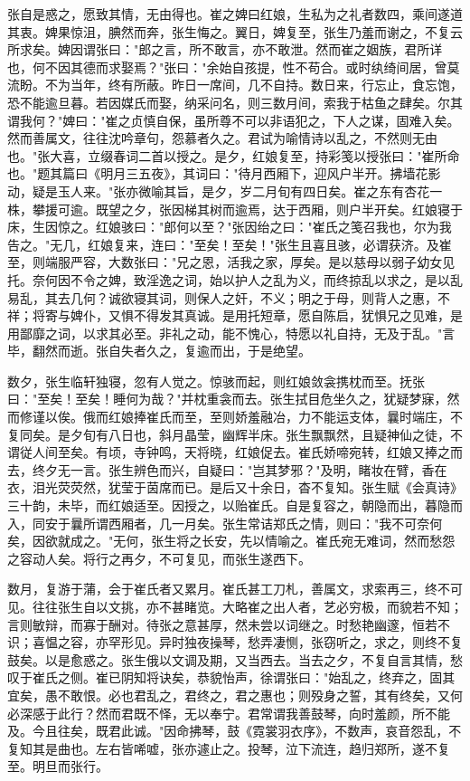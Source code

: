 \documentclass[UTF8,titlepage,oneside]{ctexbook}
\begin{document}
张自是惑之，愿致其情，无由得也。崔之婢曰红娘，生私为之礼者数四，乘间遂道其衷。婢果惊沮，腆然而奔，张生悔之。翼日，婢复至，张生乃羞而谢之，不复云所求矣。婢因谓张曰："郎之言，所不敢言，亦不敢泄。然而崔之姻族，君所详也，何不因其德而求娶焉？"张曰："余始自孩提，性不苟合。或时纨绮间居，曾莫流盼。不为当年，终有所蔽。昨日一席间，几不自持。数日来，行忘止，食忘饱，恐不能逾旦暮。若因媒氏而娶，纳采问名，则三数月间，索我于枯鱼之肆矣。尔其谓我何？"婢曰："崔之贞慎自保，虽所尊不可以非语犯之，下人之谋，固难入矣。然而善属文，往往沈吟章句，怨慕者久之。君试为喻情诗以乱之，不然则无由也。"张大喜，立缀春词二首以授之。是夕，红娘复至，持彩笺以授张曰："崔所命也。"题其篇曰《明月三五夜》，其词曰："待月西厢下，迎风户半开。拂墙花影动，疑是玉人来。"张亦微喻其旨，是夕，岁二月旬有四日矣。崔之东有杏花一株，攀援可逾。既望之夕，张因梯其树而逾焉，达于西厢，则户半开矣。红娘寝于床，生因惊之。红娘骇曰："郎何以至？"张因绐之曰："崔氏之笺召我也，尔为我告之。"无几，红娘复来，连曰："至矣！至矣！"张生且喜且骇，必谓获济。及崔至，则端服严容，大数张曰："兄之恩，活我之家，厚矣。是以慈母以弱子幼女见托。奈何因不令之婢，致淫逸之词，始以护人之乱为义，而终掠乱以求之，是以乱易乱，其去几何？诚欲寝其词，则保人之奸，不义；明之于母，则背人之惠，不祥；将寄与婢仆，又惧不得发其真诚。是用托短章，愿自陈启，犹惧兄之见难，是用鄙靡之词，以求其必至。非礼之动，能不愧心，特愿以礼自持，无及于乱。"言毕，翻然而逝。张自失者久之，复逾而出，于是绝望。

数夕，张生临轩独寝，忽有人觉之。惊骇而起，则红娘敛衾携枕而至。抚张曰："至矣！至矣！睡何为哉？"并枕重衾而去。张生拭目危坐久之，犹疑梦寐，然而修谨以俟。俄而红娘捧崔氏而至，至则娇羞融冶，力不能运支体，曩时端庄，不复同矣。是夕旬有八日也，斜月晶莹，幽辉半床。张生飘飘然，且疑神仙之徒，不谓従人间至矣。有顷，寺钟鸣，天将晓，红娘促去。崔氏娇啼宛转，红娘又捧之而去，终夕无一言。张生辨色而兴，自疑曰："岂其梦邪？"及明，睹妆在臂，香在衣，泪光荧荧然，犹莹于茵席而已。是后又十余日，杳不复知。张生赋《会真诗》三十韵，未毕，而红娘适至。因授之，以贻崔氏。自是复容之，朝隐而出，暮隐而入，同安于曩所谓西厢者，几一月矣。张生常诘郑氏之情，则曰："我不可奈何矣，因欲就成之。"无何，张生将之长安，先以情喻之。崔氏宛无难词，然而愁怨之容动人矣。将行之再夕，不可复见，而张生遂西下。

数月，复游于蒲，会于崔氏者又累月。崔氏甚工刀札，善属文，求索再三，终不可见。往往张生自以文挑，亦不甚睹览。大略崔之出人者，艺必穷极，而貌若不知；言则敏辩，而寡于酬对。待张之意甚厚，然未尝以词继之。时愁艳幽邃，恒若不识；喜愠之容，亦罕形见。异时独夜操琴，愁弄凄恻，张窃听之，求之，则终不复鼓矣。以是愈惑之。张生俄以文调及期，又当西去。当去之夕，不复自言其情，愁叹于崔氏之侧。崔已阴知将诀矣，恭貌怡声，徐谓张曰："始乱之，终弃之，固其宜矣，愚不敢恨。必也君乱之，君终之，君之惠也；则殁身之誓，其有终矣，又何必深感于此行？然而君既不怿，无以奉宁。君常谓我善鼓琴，向时羞颜，所不能及。今且往矣，既君此诚。"因命拂琴，鼓《霓裳羽衣序》，不数声，哀音怨乱，不复知其是曲也。左右皆唏嘘，张亦遽止之。投琴，泣下流连，趋归郑所，遂不复至。明旦而张行。
\end{document}
